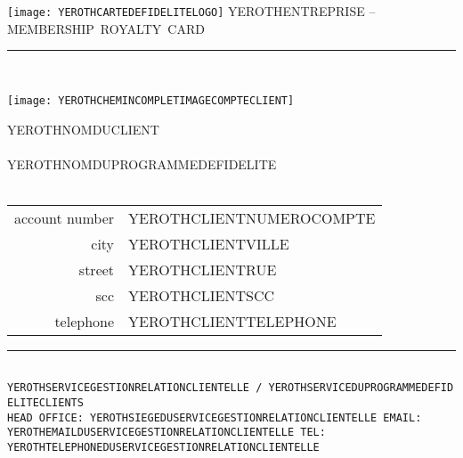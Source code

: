 \documentclass[11pt,a4paper]{memoir}
\begin{document}
    \begin{Spacing}{0.75}%
    \noindent
	\texttt{[image: YEROTHCARTEDEFIDELITELOGO]}
	{\tiny \emptyset \hfill \textcolor{yerothColorGold}{YEROTHENTREPRISE -- MEMBERSHIP~ROYALTY~CARD}}\\
    \vspace{-0.25em}
    \rule{74mm}{.3mm}\\
    \begin{minipage}[t]{33mm}
        \vspace{-0mm}%
        \texttt{[image: YEROTHCHEMINCOMPLETIMAGECOMPTECLIENT]}
    \end{minipage}
    \hspace{1mm}
    \begin{minipage}[t]{42mm}
        \vspace{-0mm}%
        \begin{flushleft}
        {\scriptsize
            \begin{Spacing}{1}%
            \textcolor{yerothColorGold}{YEROTHNOMDUCLIENT} \\
            \hspace{5mm} \\
            \hspace{5mm} YEROTHNOMDUPROGRAMMEDEFIDELITE \\
            \hspace{5mm} \vspace{2mm}\\
            \end{Spacing}
        }
        {\tiny
        	\begin{tabular}{rl}
            	{\color{gray}account number} & YEROTHCLIENTNUMEROCOMPTE \\
            	{\color{gray}city} & YEROTHCLIENTVILLE \\
            	{\color{gray}street} & YEROTHCLIENTRUE \\
            	{\color{gray}scc} & YEROTHCLIENTSCC \\
            	{\color{gray}telephone} & YEROTHCLIENTTELEPHONE \\
            \end{tabular}
            \vspace*{2mm}
        }
        \end{flushleft}
    \end{minipage}
    \rule{74mm}{0mm}\\
    \vspace{-0.45em}
    \hspace*{-0.45em}
    \texttt{\fontsize{1.83mm}{3.55mm}\selectfont YEROTHSERVICEGESTIONRELATIONCLIENTELLE~/~YEROTHSERVICEDUPROGRAMMEDEFIDELITECLIENTS \\
    \hspace*{-0.59em}
    \texttt{\fontsize{1.83mm}{3.55mm}\selectfont HEAD OFFICE: YEROTHSIEGEDUSERVICEGESTIONRELATIONCLIENTELLE \bullet{} EMAIL: YEROTHEMAILDUSERVICEGESTIONRELATIONCLIENTELLE \bullet{} TEL: YEROTHTELEPHONEDUSERVICEGESTIONRELATIONCLIENTELLE}}
    \end{Spacing}
\end{document}
